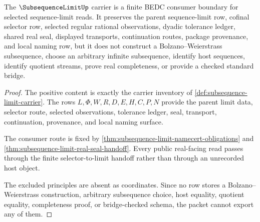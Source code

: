 \begin{theorem}\label{thm:subsequence-limit-choice-free-boundary}
The $\SubsequenceLimitUp$ carrier is a finite BEDC consumer boundary for selected sequence-limit reads. It preserves the parent sequence-limit row, cofinal selector row, selected regular rational observations, dyadic tolerance ledger, shared real seal, displayed transports, continuation routes, package provenance, and local naming row, but it does not construct a Bolzano--Weierstrass subsequence, choose an arbitrary infinite subsequence, identify host sequences, identify quotient streams, prove real completeness, or provide a checked standard bridge.
\end{theorem}
\begin{proof}
The positive content is exactly the carrier inventory of \autoref{def:subsequence-limit-carrier}. The rows $L,\Phi,W,R,D,E,H,C,P,N$ provide the parent limit data, selector route, selected observations, tolerance ledger, seal, transport, continuation, provenance, and local naming surface.

The consumer route is fixed by \autoref{thm:subsequence-limit-namecert-obligations} and \autoref{thm:subsequence-limit-real-seal-handoff}. Every public real-facing read passes through the finite selector-to-limit handoff rather than through an unrecorded host object.

The excluded principles are absent as coordinates. Since no row stores a Bolzano--Weierstrass construction, arbitrary subsequence choice, host equality, quotient equality, completeness proof, or bridge-checked schema, the packet cannot export any of them.
\end{proof}

\begin{closurestatus}{\SubsequenceLimitUp}
  \theoryclosure{\seedClosure}
  \formalstatus{\unformalizedV}
\end{closurestatus}
